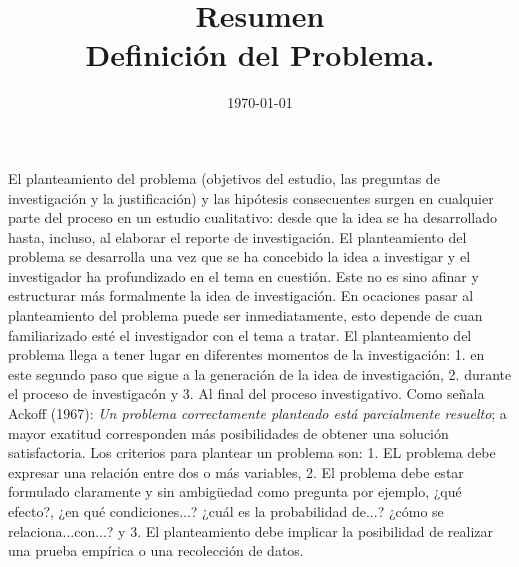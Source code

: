 \documentclass[conference]{IEEEtran}
\date{\specialdate\today}
\begin{document}
%
%
%

\newcommand{\breite}{0.9} %
\newcommand{\RelacionFiguradoscolumnas}{0.9}
\newcommand{\RelacionFiguradoscolumnasPuntoCinco}{0.45}




\title{Resumen \\ Definición del Problema.}

\author{
}



\maketitle

El planteamiento del problema (objetivos del estudio, las preguntas de investigación y la justificación) y las hipótesis consecuentes surgen en cualquier parte del proceso en un estudio cualitativo: desde que la idea se ha desarrollado hasta, incluso, al elaborar el reporte de investigación. El planteamiento del problema se desarrolla una vez que se ha concebido la idea a investigar y el investigador ha profundizado en el tema en cuestión. Este no es sino afinar y estructurar más formalmente la idea de investigación. En ocaciones pasar al planteamiento del problema puede ser inmediatamente, esto depende de cuan familiarizado esté el investigador con el tema a tratar. El planteamiento del problema llega a tener lugar en diferentes momentos de la investigación: 1. en este segundo paso que sigue a la generación de la idea de investigación, 2. durante el proceso de investigacón y 3. Al final del proceso investigativo. Como señala Ackoff (1967): \textit{Un problema correctamente planteado está parcialmente resuelto}; a mayor exatitud corresponden más posibilidades de obtener una solución satisfactoria. Los criterios para plantear un problema son: 1. EL problema debe expresar una relación entre dos o más variables, 2. El problema debe estar formulado claramente y sin ambigüedad como pregunta por ejemplo, ¿qué efecto?, ¿en qué condiciones...? ¿cuál es la probabilidad de...? ¿cómo se relaciona...con...? y 3. El planteamiento debe implicar la posibilidad de realizar una prueba empírica o una recolección de datos. 
\end{document}
